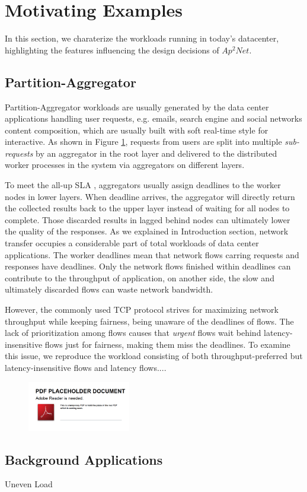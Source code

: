 \section{Motivating Examples}

In this section, we charaterize the workloads running in today's datacenter, highlighting the features influencing the design decisions of $Ap^2Net$.

\subsection{Partition-Aggregator}

Partition-Aggregator \cite{DCTCP} workloads are usually generated by the data center applications handling user requests, e.g. emails, search engine and social networks content composition, which are usually built with soft real-time style for interactive. As shown in Figure \ref{fig:par-agg}, requests from users are split into multiple \emph{sub-requests} by an aggregator in the root layer and delivered to the distributed worker processes in the system via aggregators on different layers. 

To meet the all-up SLA \cite{DCTCP}, aggregators usually assign deadlines to the worker nodes in lower layers. When deadline arrives, the aggregator will directly return the collected results back to the upper layer instead of waiting for all nodes to complete. Those discarded results in lagged behind nodes can ultimately lower the quality of the responses. As we explained in Introduction section, network transfer occupies a considerable part of total workloads of data center applications. The worker deadlines mean that network flows carring requests and responses have deadlines. Only the network flows finished within deadlines can contribute to the throughput of application, on another side, the slow and ultimately discarded flows can waste network bandwidth.

However, the commonly used TCP protocol strives for maximizing network throughput while keeping fairness, being unaware of the deadlines of flows. The lack of prioritization among flows causes that \emph{urgent} flows wait behind latency-insensitive flows just for fairness, making them miss the deadlines. To examine this issue, we reproduce the workload consisting of both throughput-preferred but latency-insensitive flows and latency flows....


\begin{figure}
  \centering
  \includegraphics[width=0.4\textwidth]{pic/placeholder}\\
  \caption{}
  \label{fig:par-agg}
\end{figure}

\subsection{Background Applications}

Uneven Load